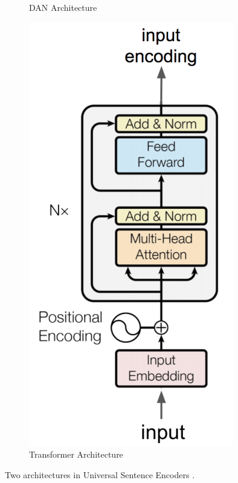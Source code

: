 \begin{figure}
\begin{subfigure}[b]{.35\textwidth}
		\caption{DAN Architecture}
		\label{fig:dan}
	\end{subfigure}%
	\begin{subfigure}[b]{.35\textwidth}
		\centering
		\includegraphics[width=\textwidth]{figures/semantic_textual_similarity/sentence_encoders/transformer.png}
		\caption{Transformer Architecture}
		\label{fig:transformer}
	\end{subfigure}
	\caption[Universal Sentence Encoder Architectures]{Two architectures in Universal Sentence Encoders \autocite{cer2018universal}.}
	\label{fig:use}
\end{figure}

